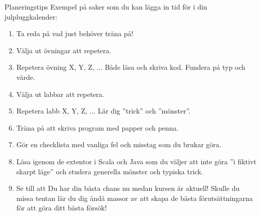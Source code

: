\begin{Slide}{Planeringstips}\SlideFontTiny
Exempel på saker som du kan lägga in tid för i din julpluggkalender:
\begin{enumerate}
\item Ta reda på vad just  behöver träna på!
\item Välja ut övningar att repetera.
\item Repetera övning X, Y, Z, ... Både läsa och skriva kod. Fundera på typ och värde.
\item Välja ut labbar att repetera.
\item Repetera labb X, Y, Z, ... Lär dig ''trick'' och ''mönster''.
\item Träna på att skriva program med papper och penna.
\item Gör en checklista med vanliga fel och misstag som du brukar göra.

\item Läsa igenom de extentor i Scala och Java som du väljer att inte göra ''i fiktivt skarpt läge'' och studera generella mönster och typiska trick.
\item Se till att  Du har din bästa chans nu medan kursen är aktuell! Skulle du missa tentan lär du dig ändå massor av att skapa de bästa förutsättningarna för att göra ditt bästa försök!
\end{enumerate}
\end{Slide}

